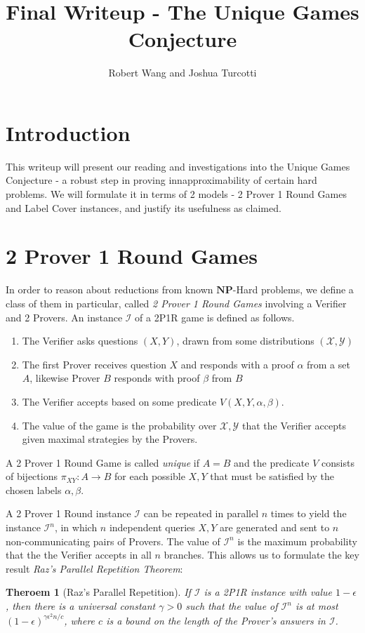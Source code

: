 \documentclass{article}
\title{Final Writeup - The Unique Games Conjecture}
\author{Robert Wang and Joshua Turcotti}
\newtheorem{theorem}{Theroem}
\newcommand{\NP}{\ensuremath{\mathbf{NP}}}
\newcommand{\X}{\mathcal{X}}
\newcommand{\Y}{\mathcal{Y}}
\renewcommand{\a}{\alpha}
\renewcommand{\b}{\beta}
\newcommand{\g}{\gamma}
\newcommand{\e}{\epsilon}
\newcommand{\I}{\mathcal{I}}
\begin{document}
\maketitle
\section{Introduction}

This writeup will present our reading and investigations into the Unique Games Conjecture - a robust step in proving innapproximability of certain hard problems. We will formulate it in terms of 2 models - 2 Prover 1 Round Games and Label Cover instances, and justify its usefulness as claimed.

\section{2 Prover 1 Round Games}


In order to reason about reductions from known \NP-Hard problems, we define a class of them in particular, called \textit{2 Prover 1 Round Games} involving a Verifier and 2 Provers. An instance $\I$ of a 2P1R game is defined as follows.
\begin{enumerate}
\item The Verifier asks questions $(X, Y)$, drawn from some distributions $(\X, \Y)$
\item The first Prover receives question $X$ and responds with a proof $\alpha$ from a set $A$, likewise Prover $B$ responds with proof $\beta$ from $B$
\item The Verifier accepts based on some predicate $V(X, Y, \alpha, \beta)$.
\item The value of the game is the probability over $\X, \Y$ that the Verifier accepts given maximal strategies by the Provers.
\end{enumerate}
A 2 Prover 1 Round Game is called \textit{unique} if $A = B$ and the predicate $V$ consists of bijections $\pi_{XY}: A \to B$ for each possible $X, Y$ that must be satisfied by the chosen labels $\a, \b$.



A 2 Prover 1 Round instance $\I$ can be repeated in parallel $n$ times to yield the instance $\I^n$, in which $n$ independent queries $X, Y$ are generated and sent to $n$ non-communicating pairs of Provers. The value of $\I^n$ is the maximum probability that the the Verifier accepts in all $n$ branches. This allows us to formulate the key result \textit{Raz's Parallel Repetition Theorem}:
\begin{theorem}[Raz's Parallel Repetition]
  If $\I$ is a 2P1R instance with value $1 - \e$, then there is a universal constant $\g > 0$ such that the value of $\I^n$ is at most $(1 - \e)^{\g \e^2 n/c}$, where $c$ is a bound on the length of the Prover's answers in $\I$.
\end{theorem}
\end{document}
